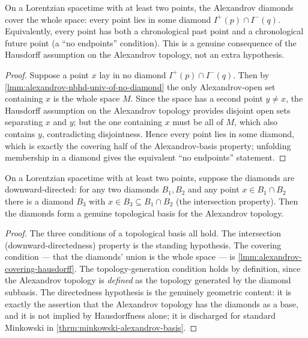 \begin{lemma}
    \label{lmm:alexandrov-covering-hausdorff}
    \leanok
    On a Lorentzian spacetime with at least two points, the Alexandrov diamonds cover the whole space: every point lies in some diamond $I^+(p) \cap I^-(q)$. Equivalently, every point has both a chronological past point and a chronological future point (a ``no endpoints'' condition). This is a genuine consequence of the Hausdorff assumption on the Alexandrov topology, not an extra hypothesis.
\end{lemma}
\begin{proof}
    \leanok
    Suppose a point $x$ lay in no diamond $I^+(p) \cap I^-(q)$. Then by \ref{lmm:alexandrov-nbhd-univ-of-no-diamond} the only Alexandrov-open set containing $x$ is the whole space $M$. Since the space has a second point $y \ne x$, the Hausdorff assumption on the Alexandrov topology provides disjoint open sets separating $x$ and $y$; but the one containing $x$ must be all of $M$, which also contains $y$, contradicting disjointness. Hence every point lies in some diamond, which is exactly the covering half of the Alexandrov-basis property; unfolding membership in a diamond gives the equivalent ``no endpoints'' statement.
\end{proof}

\begin{theorem}
    \label{thrm:alexandrov-topological-basis}
    \leanok
    On a Lorentzian spacetime with at least two points, suppose the diamonds are downward-directed: for any two diamonds $B_1, B_2$ and any point $x \in B_1 \cap B_2$ there is a diamond $B_3$ with $x \in B_3 \subseteq B_1 \cap B_2$ (the intersection property). Then the diamonds form a genuine topological basis for the Alexandrov topology.
\end{theorem}
\begin{proof}
    \leanok
    The three conditions of a topological basis all hold. The intersection (downward-directedness) property is the standing hypothesis. The covering condition --- that the diamonds' union is the whole space --- is \ref{lmm:alexandrov-covering-hausdorff}. The topology-generation condition holds by definition, since the Alexandrov topology is \emph{defined} as the topology generated by the diamond subbasis. The directedness hypothesis is the genuinely geometric content: it is exactly the assertion that the Alexandrov topology has the diamonds as a base, and it is not implied by Hausdorffness alone; it is discharged for standard Minkowski in \ref{thrm:minkowski-alexandrov-basis}.
\end{proof}

